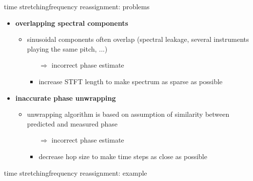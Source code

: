         \begin{frame}{time stretching}{frequency reassignment: problems}
                \begin{itemize}
                    \item   \textbf{overlapping spectral components}
                        \begin{itemize}
                            \item   sinusoidal components often overlap (spectral leakage, several instruments playing the same pitch, ...)
                            \smallskip
                                \begin{itemize}
                                    \item[$\Rightarrow$] incorrect phase estimate
                                    \smallskip
                                    \item<2-> increase STFT length to make spectrum as sparse as possible
                                \end{itemize}
                        \end{itemize}
                    \bigskip
                    \item<3->   \textbf{inaccurate phase unwrapping} 
                        \begin{itemize}
                            \item   unwrapping algorithm is based on assumption of similarity between predicted and measured phase
                            \smallskip
                                \begin{itemize}
                                    \item[$\Rightarrow$] incorrect phase estimate
                                    \smallskip
                                    \item<2-> decrease hop size to make time steps as close as possible
                                \end{itemize}
                        \end{itemize}
                \end{itemize}
        \end{frame}
        \begin{frame}{time stretching}{frequency reassignment: example}
        \end{frame}


